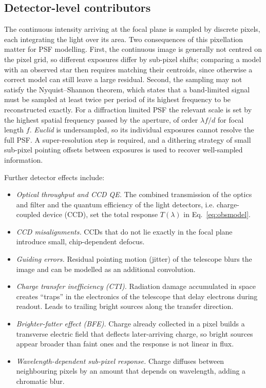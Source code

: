 \documentclass[11pt]{book}
\begin{document}
\subsection{Detector-level contributors}

The continuous intensity arriving at the focal plane is sampled by discrete pixels, each integrating the light over its area. Two consequences of this pixellation matter for PSF modelling. First, the continuous image is generally not centred on the pixel grid, so different exposures differ by sub-pixel shifts; comparing a model with an observed star then requires matching their centroids, since otherwise a correct model can still leave a large residual. Second, the sampling may not satisfy the Nyquist--Shannon theorem, which states that a band-limited signal must be sampled at least twice per period of its highest frequency to be reconstructed exactly. For a diffraction limited PSF the relevant scale is set by the highest spatial frequency passed by the aperture, of order $\lambda f/d$ for focal length $f$. \textit{Euclid} is undersampled, so its individual exposures cannot resolve the full PSF. A super-resolution step is required, and a dithering strategy of small sub-pixel pointing offsets between exposures is used to recover well-sampled information.

Further detector effects include:
\begin{itemize}
\item \textit{Optical throughput and CCD QE.} The combined transmission of the optics and filter and the quantum efficiency of the light detectors, i.e. charge-coupled device (CCD), set the total response $T(\lambda)$ in Eq.~\eqref{eq:obsmodel}.
\item \textit{CCD misalignments.} CCDs that do not lie exactly in the focal plane introduce small, chip-dependent defocus.
\item \textit{Guiding errors.} Residual pointing motion (jitter) of the telescope blurs the image and can be modelled as an additional convolution.
\item \textit{Charge transfer inefficiency (CTI).} Radiation damage accumulated in space creates ``traps'' in the electronics of the telescope that delay electrons during readout. Leads to trailing bright sources along the transfer direction.
\item \textit{Brighter-fatter effect (BFE).} Charge already collected in a pixel builds a transverse electric field that deflects later-arriving charge, so bright sources appear broader than faint ones and the response is not linear in flux.
\item \textit{Wavelength-dependent sub-pixel response.} Charge diffuses between neighbouring pixels by an amount that depends on wavelength, adding a chromatic blur.
\end{itemize}
\end{document}
